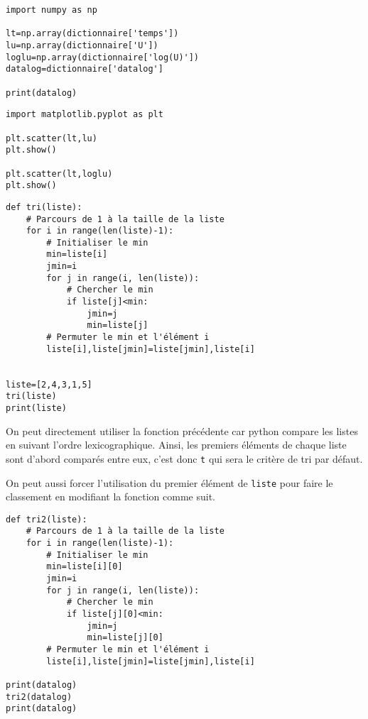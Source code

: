 \begin{verbatim}
import numpy as np

lt=np.array(dictionnaire['temps'])
lu=np.array(dictionnaire['U'])
loglu=np.array(dictionnaire['log(U)'])
datalog=dictionnaire['datalog']

print(datalog)
\end{verbatim}

\reponse{}

\begin{verbatim}
import matplotlib.pyplot as plt

plt.scatter(lt,lu)
plt.show()

plt.scatter(lt,loglu)
plt.show()
\end{verbatim}

\reponse{}

\begin{verbatim}
def tri(liste):
    # Parcours de 1 à la taille de la liste
    for i in range(len(liste)-1):
        # Initialiser le min
        min=liste[i]
        jmin=i
        for j in range(i, len(liste)):
            # Chercher le min
            if liste[j]<min:
                jmin=j
                min=liste[j]
        # Permuter le min et l'élément i
        liste[i],liste[jmin]=liste[jmin],liste[i]


liste=[2,4,3,1,5]
tri(liste)
print(liste)
\end{verbatim}

\reponse{}

On peut directement utiliser la fonction précédente car python compare les listes en suivant l'ordre lexicographique. Ainsi, les premiers éléments de chaque liste sont d'abord comparés entre eux, c'est donc \verb?t? qui sera le critère de tri par défaut.

On peut aussi forcer l'utilisation du premier élément de \verb?liste? pour faire le classement en modifiant la fonction comme suit.

\begin{verbatim}
def tri2(liste):
    # Parcours de 1 à la taille de la liste
    for i in range(len(liste)-1):
        # Initialiser le min
        min=liste[i][0]
        jmin=i
        for j in range(i, len(liste)):
            # Chercher le min
            if liste[j][0]<min:
                jmin=j
                min=liste[j][0]
        # Permuter le min et l'élément i
        liste[i],liste[jmin]=liste[jmin],liste[i]

print(datalog)
tri2(datalog)
print(datalog)
\end{verbatim}

